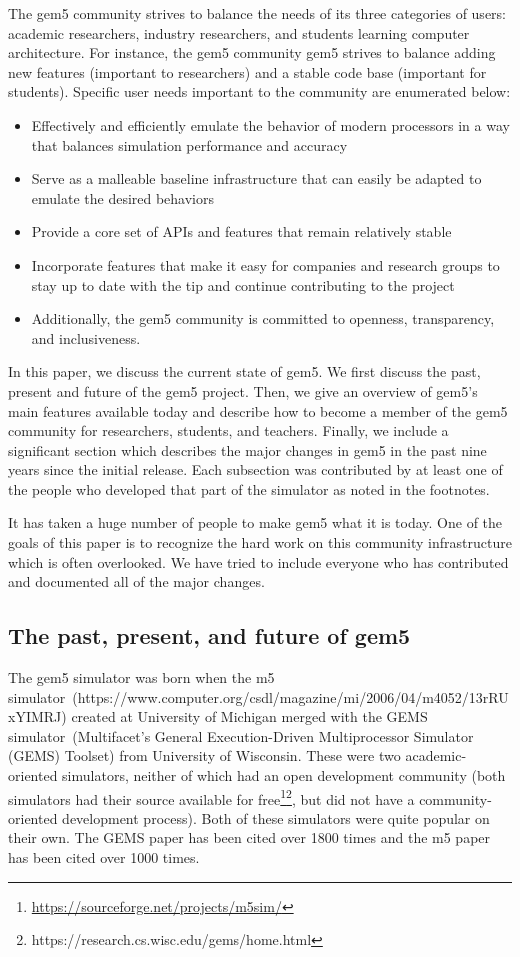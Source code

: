 The gem5 community strives to balance the needs of its three categories of users: academic researchers, industry researchers, and students learning computer architecture.
For instance, the gem5 community gem5 strives to balance adding new features (important to researchers) and a stable code base (important for students).
Specific user needs important to the community are enumerated below:
\begin{itemize}
    \item Effectively and efficiently emulate the behavior of modern processors in a way that balances simulation performance and accuracy
    \item Serve as a malleable baseline infrastructure that can easily be adapted to emulate the desired behaviors
    \item Provide a core set of APIs and features that remain relatively stable
    \item Incorporate features that make it easy for companies and research groups to stay up to date with the tip and continue contributing to the project
    \item Additionally, the gem5 community is committed to openness, transparency, and inclusiveness.
\end{itemize}

In this paper, we discuss the current state of gem5.
We first discuss the past, present and future of the gem5 project.
Then, we give an overview of gem5's main features available today and describe how to become a member of the gem5 community for researchers, students, and teachers.
Finally, we include a significant section which describes the major changes in gem5 in the past nine years since the initial release.
Each subsection was contributed by at least one of the people who developed that part of the simulator as noted in the footnotes.

It has taken a huge number of people to make gem5 what it is today.
One of the goals of this paper is to recognize the hard work on this community infrastructure which is often overlooked.
We have tried to include everyone who has contributed and documented all of the major changes.

\subsection{The past, present, and future of gem5}

The gem5 simulator was born when the m5 simulator~\cite{}(https://www.computer.org/csdl/magazine/mi/2006/04/m4052/13rRUxYIMRJ) created at University of Michigan merged with the GEMS simulator~\cite{}(Multifacet's General Execution-Driven Multiprocessor Simulator (GEMS) Toolset) from University of Wisconsin.
These were two academic-oriented simulators, neither of which had an open development community (both simulators had their source available for free\footnote{\url{https://sourceforge.net/projects/m5sim/}}\footnote{https://research.cs.wisc.edu/gems/home.html}, but did not have a community-oriented development process).
Both of these simulators were quite popular on their own.
The GEMS paper has been cited over 1800 times and the m5 paper has been cited over 1000 times.

